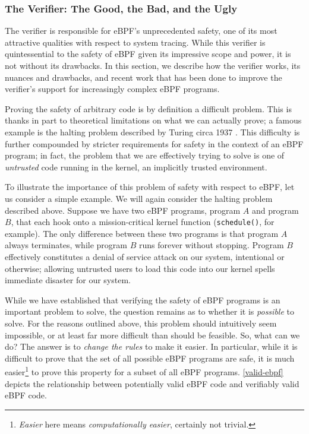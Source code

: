 \documentclass[
  12pt]{findlay}
\newcommand{\passthrough}[1]{#1}
\begin{document}
\FloatBarrier

\hypertarget{the-verifier-the-good-the-bad-and-the-ugly}{%
\subsubsection{The Verifier: The Good, the Bad, and the
Ugly}\label{the-verifier-the-good-the-bad-and-the-ugly}}

\label{verifier-section}

The verifier is responsible for eBPF's unprecedented safety, one of its
most attractive qualities with respect to system tracing. While this
verifier is quintessential to the safety of eBPF given its impressive
scope and power, it is not without its drawbacks. In this section, we
describe how the verifier works, its nuances and drawbacks, and recent
work that has been done to improve the verifier's support for
increasingly complex eBPF programs.

Proving the safety of arbitrary code is by definition a difficult
problem. This is thanks in part to theoretical limitations on what we
can actually prove; a famous example is the halting problem described by
Turing circa 1937 \autocite{turing37}. This difficulty is further
compounded by stricter requirements for safety in the context of an eBPF
program; in fact, the problem that we are effectively trying to solve is
one of \emph{untrusted} code running in the kernel, an implicitly
trusted environment.

To illustrate the importance of this problem of safety with respect to
eBPF, let us consider a simple example. We will again consider the
halting problem described above. Suppose we have two eBPF programs,
program \(A\) and program \(B\), that each hook onto a mission-critical
kernel function (\passthrough{\lstinline!schedule()!}, for example). The
only difference between these two programs is that program \(A\) always
terminates, while program \(B\) runs forever without stopping. Program
\(B\) effectively constitutes a denial of service attack
\autocite{hussain03} on our system, intentional or otherwise; allowing
untrusted users to load this code into our kernel spells immediate
disaster for our system.

While we have established that verifying the safety of eBPF programs is
an important problem to solve, the question remains as to whether it is
\emph{possible} to solve. For the reasons outlined above, this problem
should intuitively seem impossible, or at least far more difficult than
should be feasible. So, what can we do? The answer is to \emph{change
the rules} to make it easier. In particular, while it is difficult to
prove that the set of all possible eBPF programs are safe, it is much
easier\footnote{\emph{Easier}
here means \emph{computationally easier}, certainly not trivial.} to
prove this property for a subset of all eBPF programs.
\autoref{valid-ebpf} depicts the relationship between potentially valid
eBPF code and verifiably valid eBPF code.
\end{document}
